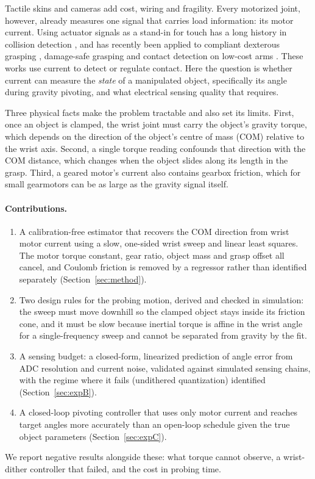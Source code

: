 \documentclass[11pt]{article}
\begin{document}
Tactile skins and cameras add cost, wiring and fragility. Every motorized joint, however, already measures one signal that carries load information: its motor current. Using actuator signals as a stand-in for touch has a long history in collision detection \cite{deluca2005}, and has recently been applied to compliant dexterous grasping \cite{ma2026}, damage-safe grasping \cite{shuto2026} and contact detection on low-cost arms \cite{zhu2026}. These works use current to detect or regulate contact. Here the question is whether current can measure the \emph{state} of a manipulated object, specifically its angle during gravity pivoting, and what electrical sensing quality that requires.

Three physical facts make the problem tractable and also set its limits. First, once an object is clamped, the wrist joint must carry the object's gravity torque, which depends on the direction of the object's centre of mass (COM) relative to the wrist axis. Second, a single torque reading confounds that direction with the COM distance, which changes when the object slides along its length in the grasp. Third, a geared motor's current also contains gearbox friction, which for small gearmotors can be as large as the gravity signal itself.

\paragraph{Contributions.}
\begin{enumerate}
\item A calibration-free estimator that recovers the COM direction from wrist motor current using a slow, one-sided wrist sweep and linear least squares. The motor torque constant, gear ratio, object mass and grasp offset all cancel, and Coulomb friction is removed by a regressor rather than identified separately (Section~\ref{sec:method}).
\item Two design rules for the probing motion, derived and checked in simulation: the sweep must move downhill so the clamped object stays inside its friction cone, and it must be slow because inertial torque is affine in the wrist angle for a single-frequency sweep and cannot be separated from gravity by the fit.
\item A sensing budget: a closed-form, linearized prediction of angle error from ADC resolution and current noise, validated against \Bconfigs{} simulated sensing chains, with the regime where it fails (undithered quantization) identified (Section~\ref{sec:expB}).
\item A closed-loop pivoting controller that uses only motor current and reaches target angles more accurately than an open-loop schedule given the true object parameters (Section~\ref{sec:expC}).
\end{enumerate}
We report negative results alongside these: what torque cannot observe, a wrist-dither controller that failed, and the cost in probing time.
\end{document}
